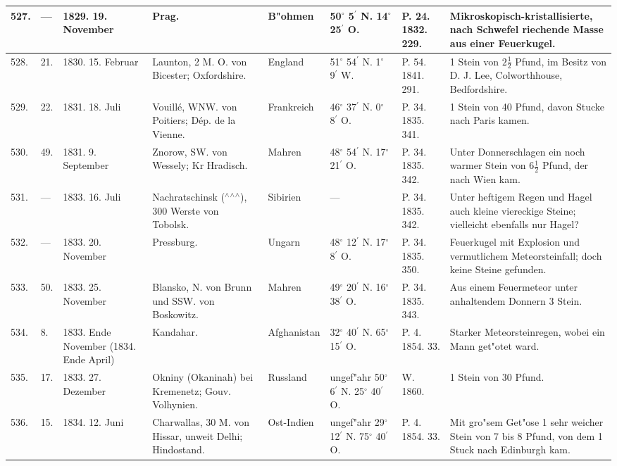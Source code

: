 \documentclass[a4paper, 8pt, oneside, polutonikogreek, german]{article}
\begin{document}
\begin{center}
\begin{longtable}{| p{4mm} | p{2mm} | p{15mm} | p{25mm} | p{16mm} | p{12mm} | p{13mm} | p{20mm} |}
        527. & --- & 1829. 19. November & Prag. & B"ohmen & 50$^\circ$ 5$^\prime$ N. 14$^\circ$ 25$^\prime$ O. & P. 24. 1832. 229. & Mikroskopisch-kristallisierte, nach Schwefel riechende Masse aus einer Feuerkugel. \\ \hline
        528. & 21. & 1830. 15. Februar & Launton, 2 M. O. von Bicester; Oxfordshire. & England & 51$^\circ$ 54$^\prime$ N. 1$^\circ$ 9$^\prime$ W. & P. 54. 1841. 291. & 1 Stein von $2\frac{1}{2}$ Pfund, im Besitz von D. J. Lee, Colworthhouse, Bedfordshire. \\ \hline
        529. & 22. & 1831. 18. Juli & Vouillé, WNW. von Poitiers; Dép. de la Vienne. & Frankreich & 46$^\circ$ 37$^\prime$ N. 0$^\circ$ 8$^\prime$ O. & P. 34. 1835. 341. & 1 Stein von 40 Pfund, davon Stucke nach Paris kamen. \\ \hline
        530. & 49. & 1831. 9. September & Znorow, SW. von Wessely; Kr Hradisch. & Mahren & 48$^\circ$ 54$^\prime$ N. 17$^\circ$ 21$^\prime$ O. & P. 34. 1835. 342. & Unter Donnerschlagen ein noch warmer Stein von $6\frac{1}{2}$ Pfund, der nach Wien kam. \\ \hline
        531. & --- & 1833. 16. Juli & Nachratschinsk ($^\wedge$$^\wedge$$^\wedge$), 300 Werste von Tobolsk. & Sibirien & --- & P. 34. 1835. 342. & Unter heftigem Regen und Hagel auch kleine viereckige Steine; vielleicht ebenfalls nur Hagel? \\ \hline
        532. & --- & 1833. 20. November & Pressburg. & Ungarn & 48$^\circ$ 12$^\prime$ N. 17$^\circ$ 8$^\prime$ O. & P. 34. 1835. 350. & Feuerkugel mit Explosion und vermutlichem Meteorsteinfall; doch keine Steine gefunden. \\ \hline
        533. & 50. & 1833. 25. November & Blansko, N. von Brunn und SSW. von Boskowitz. & Mahren & 49$^\circ$ 20$^\prime$ N. 16$^\circ$ 38$^\prime$ O. & P. 34. 1835. 343. & Aus einem Feuermeteor unter anhaltendem Donnern 3 Stein. \\ \hline
        534. & 8. & 1833. Ende November (1834. Ende April) & Kandahar. & Afghanistan & 32$^\circ$ 40$^\prime$ N. 65$^\circ$ 15$^\prime$ O. & P. 4. 1854. 33. & Starker Meteorsteinregen, wobei ein Mann get"otet ward. \\ \hline
        535. & 17. & 1833. 27. Dezember & Okniny (Okaninah) bei Kremenetz; Gouv. Volhynien. & Russland & ungef"ahr 50$^\circ$ 6$^\prime$ N. 25$^\circ$ 40$^\prime$ O. & W. 1860. & 1 Stein von 30 Pfund. \\ \hline
        536. & 15. & 1834. 12. Juni & Charwallas, 30 M. von Hissar, unweit Delhi; Hindostand. & Ost-Indien & ungef"ahr 29$^\circ$ 12$^\prime$ N. 75$^\circ$ 40$^\prime$ O. & P. 4. 1854. 33. & Mit gro"sem Get"ose 1 sehr weicher Stein von 7 bis 8 Pfund, von dem 1 Stuck nach Edinburgh kam. \\ \hline

\end{longtable}
\end{center}
\end{document}
